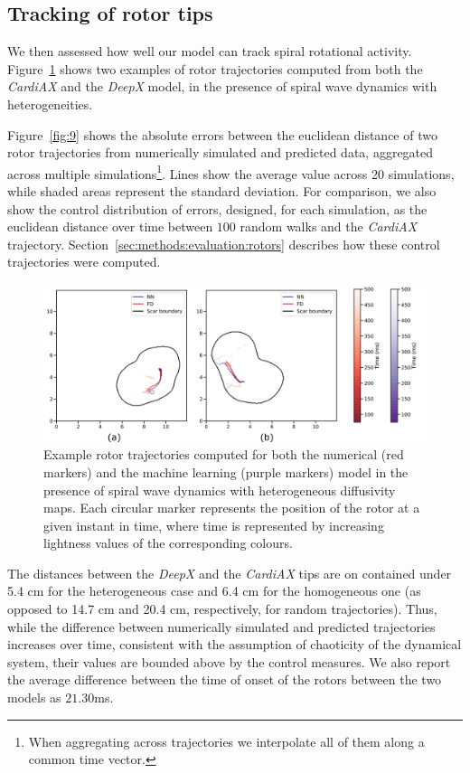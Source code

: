 \documentclass[utf8]{frontiersSCNS} %
\begin{document}
\subsection{Tracking of rotor tips}
\label{sec:results:rotors}
We then assessed how well our model can track spiral rotational activity.
%
Figure~\ref{fig:8} shows two examples of rotor trajectories computed from both the \textit{CardiAX} and the \textit{DeepX} model, in the presence of spiral wave dynamics with heterogeneities.

Figure~\ref{fig:9} shows the absolute errors between the euclidean distance of two rotor trajectories from numerically simulated and predicted data, aggregated across multiple simulations\footnote{When aggregating across trajectories we interpolate all of them along a common time vector.}. Lines show the average value across 20 simulations, while shaded areas represent the standard deviation. %
For comparison, we also show the control distribution of errors, designed, for each simulation, as the euclidean distance over time between $100$ random walks and the \textit{CardiAX} trajectory. Section~\ref{sec:methods:evaluation:rotors} describes how these control trajectories were computed. 

\begin{figure}[!htp]
\centering
\includegraphics[width=.9\textwidth]{Figure-8.png}
\caption{Example rotor trajectories computed for both the numerical (red markers) and the machine learning (purple markers) model in the presence of spiral wave dynamics with heterogeneous diffusivity maps. Each circular marker represents the position of the rotor at a given instant in time, where time is represented by increasing lightness values of the corresponding colours.
}
\label{fig:8}
\end{figure}

The distances between the \textit{DeepX} and the \textit{CardiAX} tips are on contained under 5.4 cm for the heterogeneous case and 6.4 cm for the homogeneous one (as opposed to 14.7 cm and 20.4 cm, respectively, for random trajectories).
Thus, while the difference between numerically simulated and predicted trajectories increases over time, consistent with the assumption of chaoticity of the dynamical system, their values are bounded above by the control measures.
We also report the average difference between the time of onset of the rotors between the two models as $21.30$ms. 
\end{document}
